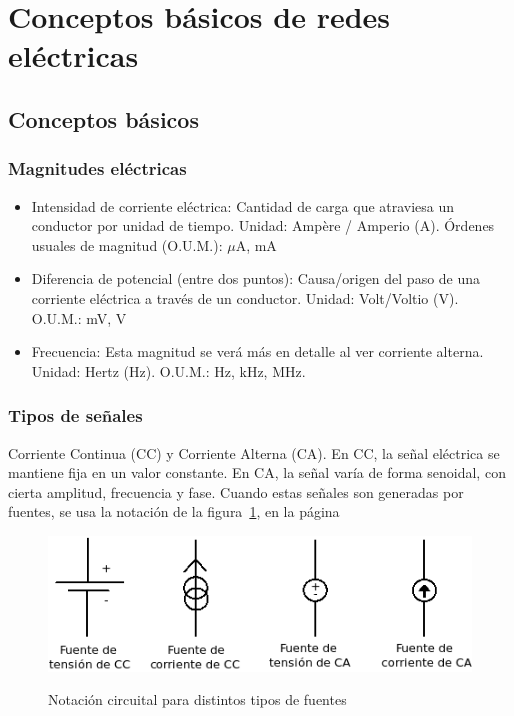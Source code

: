 \documentclass{article}
\begin{document}
\setcounter{section}{-1}
\section{Conceptos básicos de redes eléctricas}

\subsection{Conceptos básicos}

\subsubsection{Magnitudes eléctricas}

\begin{itemize}
	\item Intensidad de corriente eléctrica: Cantidad de carga que atraviesa un conductor por unidad de tiempo. Unidad: Ampère / Amperio (A). Órdenes usuales de magnitud (O.U.M.): $\mu$A, mA
	\item Diferencia de potencial (entre dos puntos): Causa/origen del paso de una corriente eléctrica a través
	de un conductor. Unidad: Volt/Voltio (V). O.U.M.: mV, V
	\item Frecuencia: Esta magnitud se verá más en detalle al ver corriente alterna. Unidad: Hertz (Hz).
	 O.U.M.: Hz, kHz, MHz.
\end{itemize}

\subsubsection{Tipos de señales}

Corriente Continua (CC) y Corriente Alterna (CA). En CC, la señal eléctrica se mantiene fija en un valor constante.
En CA, la señal varía de forma senoidal, con cierta amplitud, frecuencia y fase. Cuando estas señales son
generadas por fuentes, se usa la notación de la figura~\ref{fig:001_fuentes}, en la página \pageref{fig:001_fuentes}

\begin{figure}[t]
\caption{Notación circuital para distintos tipos de fuentes}
\includegraphics[scale=0.75]{img/teo_fig001_fuentes.png} 
\centering
\label{fig:001_fuentes}
\end{figure}
\end{document}
